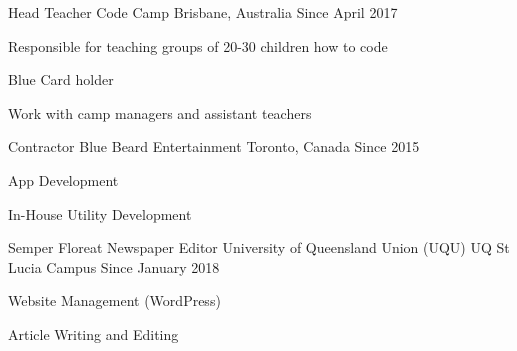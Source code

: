 


\begin{cventries}


\cventry
{Head Teacher} %
{Code Camp} %
{Brisbane, Australia} %
{Since April 2017} %
{ %
\begin{cvitems}
\item {Responsible for teaching groups of 20-30 children how to code}
\item {Blue Card holder}
\item {Work with camp managers and assistant teachers}
\end{cvitems}
}


\cventry
{Contractor} %
{Blue Beard Entertainment} %
{Toronto, Canada} %
{Since 2015} %
{ %
\begin{cvitems}
\item {App Development}
\item {In-House Utility Development}
\end{cvitems}
}


\cventry
{Semper Floreat Newspaper Editor} %
{University of Queensland Union (UQU)} %
{UQ St Lucia Campus} %
{Since January 2018} %
{ %
\begin{cvitems}
\item {Website Management (WordPress)}
\item {Article Writing and Editing}
\end{cvitems}
}


\end{cventries}